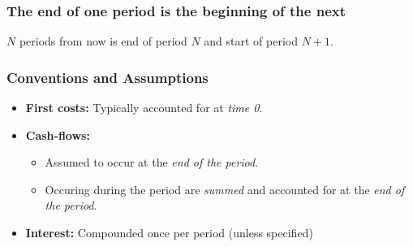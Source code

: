     \subsubsection{The end of one period is the beginning of the next}
    \begin{definition}
        $N$ periods from now is end of period $N$ and start of period $N+1$.
    \end{definition}

    \subsubsection{Conventions and Assumptions}
    \begin{definition}
        \begin{itemize}
            \item \textbf{First costs:} Typically accounted for at \emph{time 0}.
            \item \textbf{Cash-flows:} 
            \begin{itemize}
                \item Assumed to occur at the \emph{end of the period}.
                \item Occuring during the period are \emph{summed} and accounted for at the \emph{end of the period}.
            \end{itemize}
            \item \textbf{Interest:} Compounded once per period (unless specified)
        \end{itemize}
    \end{definition}

